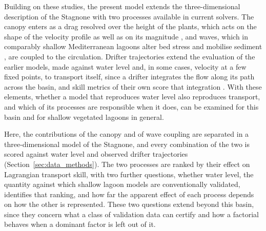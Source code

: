 Building on these studies, the present model extends the three-dimensional
description of the Stagnone with two processes available in current solvers.
The canopy enters as a drag resolved over the height of the plants, which acts
on the shape of the velocity profile as well as on its magnitude
\citep{Nepf2012}, and waves, which in comparably shallow Mediterranean lagoons
alter bed stress and mobilise sediment \citep{Carniello2011, Morote2025}, are
coupled to the circulation. Drifter trajectories extend the evaluation of the
earlier models, made against water level and, in some cases, velocity at a few
fixed points, to transport itself, since a drifter integrates the flow along
its path across the basin, and skill metrics of their own score that
integration \citep{Liu2011, Revelard2021}. With these elements,
whether a model that reproduces water level also reproduces transport, and
which of its processes are responsible when it does, can be examined for this
basin and for shallow vegetated lagoons in general.

Here, the contributions of the canopy and of wave coupling are separated in a
three-dimensional model of the Stagnone, and every combination of the two is
scored against water level and observed drifter trajectories
(Section~\ref{sec:data_methods}). The two processes are ranked by their effect
on Lagrangian transport skill, with two further questions, whether water level,
the quantity against which shallow lagoon models are conventionally validated,
identifies that ranking, and how far the apparent effect of each process
depends on how the other is represented. These two questions extend beyond this basin,
since they concern what a class of validation data can certify and how a
factorial behaves when a dominant factor is left out of it.
